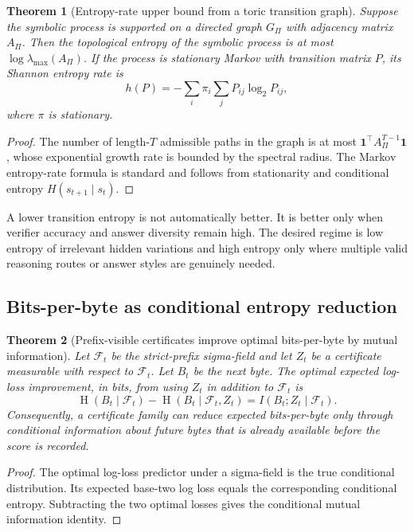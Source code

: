 \documentclass[10pt]{article}
\newtheorem{theorem}{Theorem}[section]
\newcommand{\Ent}{\operatorname{H}}
\numberwithin{equation}{section}
\begin{document}
\begin{theorem}[Entropy-rate upper bound from a toric transition graph]
Suppose the symbolic process is supported on a directed graph $G_\Pi$ with adjacency matrix $A_\Pi$. Then the topological entropy of the symbolic process is at most $\log \lambda_{\max}(A_\Pi)$. If the process is stationary Markov with transition matrix $P$, its Shannon entropy rate is
\begin{equation}
h(P)=-\sum_i \pi_i\sum_j P_{ij}\log_2 P_{ij},
\end{equation}
where $\pi$ is stationary.
\end{theorem}
\begin{proof}
The number of length-$T$ admissible paths in the graph is at most $\mathbf{1}^\top A_\Pi^{T-1}\mathbf{1}$, whose exponential growth rate is bounded by the spectral radius. The Markov entropy-rate formula is standard and follows from stationarity and conditional entropy $H(s_{t+1}\mid s_t)$.
\end{proof}

A lower transition entropy is not automatically better. It is better only when verifier accuracy and answer diversity remain high. The desired regime is low entropy of irrelevant hidden variations and high entropy only where multiple valid reasoning routes or answer styles are genuinely needed.

\subsection{Bits-per-byte as conditional entropy reduction}
\begin{theorem}[Prefix-visible certificates improve optimal bits-per-byte by mutual information]
Let $\mathcal{F}_t$ be the strict-prefix sigma-field and let $Z_t$ be a certificate measurable with respect to $\mathcal{F}_t$. Let $B_t$ be the next byte. The optimal expected log-loss improvement, in bits, from using $Z_t$ in addition to $\mathcal{F}_t$ is
\begin{equation}
\Ent(B_t\mid \mathcal{F}_t)-\Ent(B_t\mid \mathcal{F}_t,Z_t)=I(B_t;Z_t\mid \mathcal{F}_t).
\end{equation}
Consequently, a certificate family can reduce expected bits-per-byte only through conditional information about future bytes that is already available before the score is recorded.
\end{theorem}
\begin{proof}
The optimal log-loss predictor under a sigma-field is the true conditional distribution. Its expected base-two log loss equals the corresponding conditional entropy. Subtracting the two optimal losses gives the conditional mutual information identity.
\end{proof}
\end{document}
